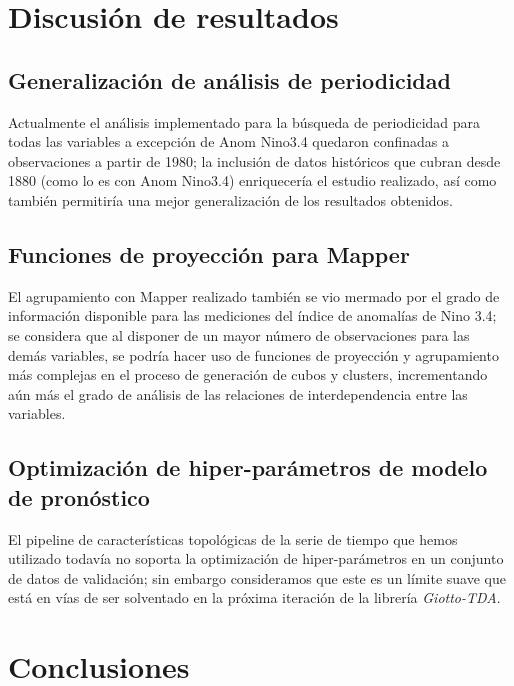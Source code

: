 \documentclass{article}
\begin{document}
    \section{Discusión de resultados}\label{sec:discusion}

        \subsection{Generalización de análisis de periodicidad}

            Actualmente el análisis implementado para la búsqueda de periodicidad para todas las variables a excepción de Anom Nino3.4 quedaron confinadas a observaciones a partir de 1980; la inclusión de datos históricos que cubran desde 1880 (como lo es con Anom Nino3.4) enriquecería el estudio realizado, así como también permitiría una mejor generalización de los resultados obtenidos.

        \subsection{Funciones de proyección para Mapper}

            El agrupamiento con Mapper realizado también se vio mermado por el grado de información disponible para las mediciones del índice de anomalías de Nino 3.4; se considera que al disponer de un mayor número de observaciones para las demás variables, se podría hacer uso de funciones de proyección y agrupamiento más complejas en el proceso de generación de cubos y clusters, incrementando aún más el grado de análisis de las relaciones de interdependencia entre las variables.

        \subsection{Optimización de hiper-parámetros de modelo de pronóstico}

            El pipeline de características topológicas de la serie de tiempo que hemos utilizado todavía no soporta la optimización de hiper-parámetros en un conjunto de datos de validación; sin embargo consideramos que este es un límite suave que está en vías de ser solventado en la próxima iteración de la librería \textit{Giotto-TDA}.

    \section{Conclusiones}\label{sec:conclusions}
\end{document}
